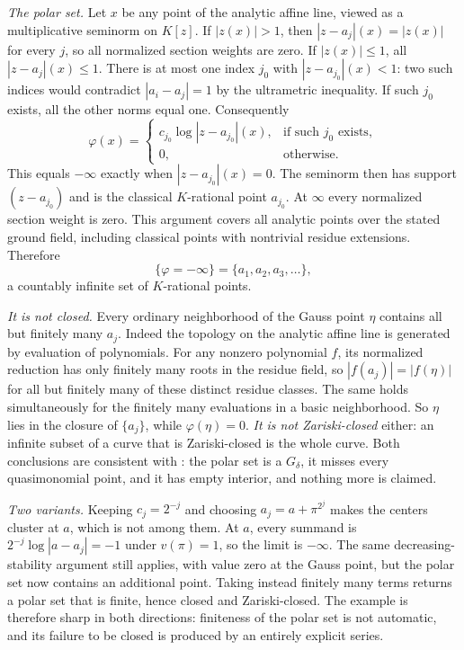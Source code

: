 \begin{example}
\emph{The polar set.}  Let $x$ be any point of the analytic affine
line, viewed as a multiplicative seminorm on $K[z]$.  If $|z(x)|>1$,
then $|z-a_j|(x)=|z(x)|$ for every $j$, so all normalized section weights
are zero.  If $|z(x)|\leq1$, all $|z-a_j|(x)\leq1$.  There is at most
one index $j_0$ with $|z-a_{j_0}|(x)<1$: two such indices would contradict
$|a_i-a_j|=1$ by the ultrametric inequality.  If such $j_0$ exists,
all the other norms equal one.  Consequently
\[
 \varphi(x)=
 \begin{cases}
  c_{j_0}\log|z-a_{j_0}|(x),&\text{if such }j_0\text{ exists},\\
  0,&\text{otherwise}.
 \end{cases}
\]
This equals $-\infty$ exactly when $|z-a_{j_0}|(x)=0$.  The seminorm
then has support $(z-a_{j_0})$ and is the classical $K$-rational point
$a_{j_0}$.  At $\infty$ every normalized section weight is zero.
This argument covers all analytic points over the stated ground field,
including classical points with nontrivial residue extensions.  Therefore
\begin{equation}
\label{eq:ch21-polar-computed}
 \{\varphi=-\infty\}=\{a_1,a_2,a_3,\ldots\},
\end{equation}
a countably infinite set of $K$-rational points.

\emph{It is not closed.}  Every ordinary neighborhood of the Gauss
point $\eta$ contains all but finitely many $a_j$.  Indeed the topology on
the analytic affine line is generated by evaluation of polynomials.
For any nonzero polynomial $f$, its normalized reduction has only
finitely many roots in the residue field, so $|f(a_j)|=|f(\eta)|$ for
all but finitely many of these distinct residue classes.  The same holds
simultaneously for the finitely many evaluations in a basic neighborhood.  So $\eta$ lies in the closure of
$\{a_j\}$, while $\varphi(\eta)=0$.  \emph{It is not
Zariski-closed} either: an infinite subset of a curve that is
Zariski-closed is the whole curve.  Both conclusions are consistent with
: the polar set is a $G_\delta$, it misses
every quasimonomial point, and it has empty interior, and nothing more is
claimed.

\emph{Two variants.}  Keeping $c_j=2^{-j}$ and choosing
$a_j=a+\pi^{2^j}$ makes the centers cluster at $a$, which is not among
them.  At $a$, every summand is
$2^{-j}\log|a-a_j|=-1$ under $v(\pi)=1$, so the limit is $-\infty$.
The same decreasing-stability argument still applies, with value zero
at the Gauss point, but the polar set now contains an additional point.  Taking instead finitely many terms returns a polar set
that is finite, hence closed and Zariski-closed.  The example is therefore
sharp in both directions: finiteness of the polar set is not automatic, and
its failure to be closed is produced by an entirely explicit series.
\end{example}

